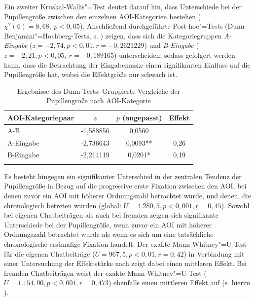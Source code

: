 Ein zweiter Kruskal-Wallis"=Test deutet darauf hin, dass Unterschiede bei der Pupillengröße zwischen den einzelnen AOI-Kategorien bestehen ($\chi^2(6) = 8,68,\allowbreak\ p < 0,05$). Anschließend durchgeführte Post-hoc"=Tests (Dunn-Benjamini"=Hoch\-berg-Tests, s. ) zeigen, dass sich die Kategoriegruppen \emph{A-Ein\-ga\-be} ($z = -2,74, p < 0,01, r = -0,2621229$) und \emph{B-Eingabe} ($z = -2,21, p < 0,05,\allowbreak\ r = -0,189165$) unterscheiden, sodass gefolgert werden kann, dass die Betrachtung der Eingabemaske einen signifikanten Einfluss auf die Pupillengröße hat, wobei die Effektgröße nur schwach ist.



\begin{table}
    \begin{tabular}{lS[table-format=-1.6]S[table-format=1.4{**}]S[table-format=1.2]}  
    \lsptoprule
        {AOI-Kategoriepaar} & {$z$} & {$p$ (angepasst)} & {Effekt}\\ 
        \midrule
        A-B       & -1,588856 & 0,0560 &  \\
        A-Eingabe & -2,736643 & 0,0093{**} & 0,26  \\ 
        B-Eingabe & -2,214119 & 0,0201{*} & 0,19 \\ 
        \lspbottomrule
    \end{tabular}
    \caption{Ergebnisse des Dunn-Tests: Gruppierte Vergleiche der Pupillengröße nach AOI-Kategorie\label{K6:tab:DeDe:dunntest-pupilsize}}
\end{table}



Es besteht hingegen ein signifikanter Unterschied in der zentralen Tendenz der Pupillengröße in Bezug auf die progressive erste Fixation zwischen den AOI, bei denen zuvor ein AOI mit höherer Ordnungszahl betrachtet wurde, und denen, die chronologisch betreten wurden (global: $U = 4.280,5, p < 0,001, r = 0,45$). Sowohl bei eigenen Chatbeiträgen als auch bei fremden zeigen sich signifikante Unterschiede bei der Pupillengröße, wenn zuvor ein AOI mit höherer Ordnungszahl betrachtet wurde als wenn es sich um eine tatsächliche chronologische erstmalige Fixation handelt. Der exakte Mann-Whitney"=U-Test für die eigenen Chatbeiträge ($U = 967,5, p < 0,01, r = 0,42$) in Verbindung mit einer Untersuchung der Effektstärke nach \citet{cohen_power_1992} zeigt dabei einen mittleren Effekt. Bei fremden Chatbeiträgen weist der exakte Mann-Whitney"=U-Test ($U = 1.154,00, p < 0,001, r = 0,473$) ebenfalls einen mittleren Effekt auf (s. hierzu ).

